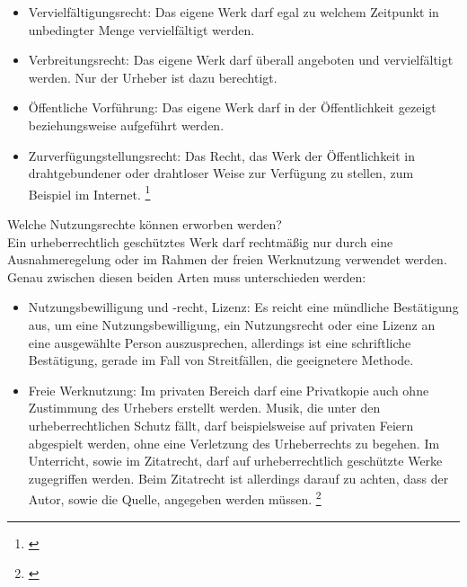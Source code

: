 \documentclass[titlepage,12pt,twoside]{article}
\begin{document}
\begin{itemize}
	\item Vervielfältigungsrecht: Das eigene Werk darf egal zu welchem Zeitpunkt in unbedingter Menge 
	vervielfältigt werden.
	\item Verbreitungsrecht: Das eigene Werk darf überall angeboten und vervielfältigt werden. Nur der 
	Urheber ist dazu berechtigt.
	\item Öffentliche Vorführung: Das eigene Werk darf in der Öffentlichkeit gezeigt beziehungsweise 
	aufgeführt werden. 
	\item Zurverfügungstellungsrecht: Das Recht, das Werk der Öffentlichkeit in drahtgebundener oder 
	drahtloser Weise zur Verfügung zu stellen, zum Beispiel im Internet. \footnote{\cite{Saferinternet.p11}}
\end{itemize}
\hfill \break
Welche Nutzungsrechte können erworben werden? \\
Ein urheberrechtlich geschütztes Werk darf rechtmäßig nur durch eine Ausnahmeregelung oder im Rahmen der 
freien Werknutzung verwendet werden. Genau zwischen diesen beiden Arten muss unterschieden werden: \\
\begin{itemize}
	\item Nutzungsbewilligung und -recht, Lizenz: Es reicht eine mündliche Bestätigung aus, um eine 
	Nutzungsbewilligung, ein Nutzungsrecht oder eine Lizenz an eine ausgewählte Person auszusprechen, 
	allerdings ist eine schriftliche Bestätigung, gerade im Fall von Streitfällen, die geeignetere Methode.
	\item Freie Werknutzung: Im privaten Bereich darf eine Privatkopie auch ohne Zustimmung des Urhebers erstellt 
	werden. Musik, die unter den urheberrechtlichen Schutz fällt, darf beispielsweise auf privaten Feiern abgespielt werden, ohne 
	eine Verletzung des Urheberrechts zu begehen. Im Unterricht, sowie im Zitatrecht, darf auf urheberrechtlich geschützte Werke 
	zugegriffen werden. Beim Zitatrecht ist allerdings darauf zu achten, dass der Autor, sowie die Quelle, angegeben werden müssen.  \footnote{\cite{Saferinternet.p29}}
\end{itemize}
\hfill \break
\end{document}
